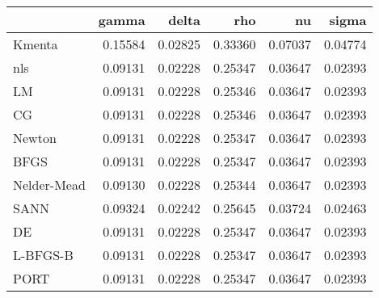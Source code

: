 \begin{tabular}{lrrrrr}
  \hline
 & gamma & delta & rho & nu & sigma \\ 
  \hline
Kmenta & 0.15584 & 0.02825 & 0.33360 & 0.07037 & 0.04774 \\ 
  nls & 0.09131 & 0.02228 & 0.25347 & 0.03647 & 0.02393 \\ 
  LM & 0.09131 & 0.02228 & 0.25346 & 0.03647 & 0.02393 \\ 
  CG & 0.09131 & 0.02228 & 0.25346 & 0.03647 & 0.02393 \\ 
  Newton & 0.09131 & 0.02228 & 0.25347 & 0.03647 & 0.02393 \\ 
  BFGS & 0.09131 & 0.02228 & 0.25347 & 0.03647 & 0.02393 \\ 
  Nelder-Mead & 0.09130 & 0.02228 & 0.25344 & 0.03647 & 0.02393 \\ 
  SANN & 0.09324 & 0.02242 & 0.25645 & 0.03724 & 0.02463 \\ 
  DE & 0.09131 & 0.02228 & 0.25347 & 0.03647 & 0.02393 \\ 
  L-BFGS-B & 0.09131 & 0.02228 & 0.25347 & 0.03647 & 0.02393 \\ 
  PORT & 0.09131 & 0.02228 & 0.25347 & 0.03647 & 0.02393 \\ 
   \hline
\end{tabular}
